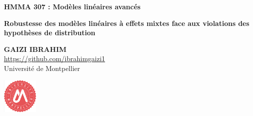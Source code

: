 \documentclass[unknownkeysallowed]{beamer}
\begin{document}



\begin{frame}[noframenumbering]
\thispagestyle{empty}
\bigskip
\bigskip
\begin{center}{
\LARGE\color{marron}
\textbf{HMMA 307 : Modèles linéaires avancés}
\textbf{ }\\
\vspace{0.5cm}
}

\color{marron}
\textbf{Robustesse des modèles linéaires à effets mixtes face aux violations des hypothèses de distribution}
\end{center}

\vspace{0.5cm}

\begin{center}
\textbf{ GAIZI IBRAHIM  } \\
\vspace{0.1cm}
\url{https://github.com/ibrahimgaizi1}\\
\vspace{0.5cm}
Université de Montpellier \\
\end{center}

\centering
\includegraphics[width=0.13\textwidth]{logo.png}
\end{frame}



\begin{frame}[noframenumbering]
\thispagestyle{empty}
\tableofcontents
\end{frame}





\end{document}
